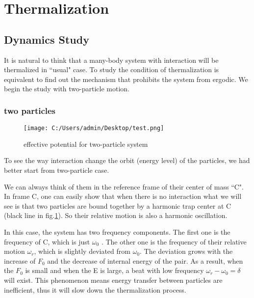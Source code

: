 \documentclass[aps,pre,twocolumn
,groupedaddress]{revtex4-1}
\begin{document}
\section{Thermalization}
\subsection{Dynamics Study}
It is natural to think that a many-body system with interaction will be thermalized in ``usual" case. To study the condition of thermalization is equivalent to find out the mechanism that prohibits the system from ergodic. We begin the study with two-particle motion. 
\subsubsection{two particles}

\begin{figure}[hbtp]
\centering
\texttt{[image: C:/Users/admin/Desktop/test.png]}
\caption{effective potential for two-particle system}
\label{fig:thermalization2}
\end{figure}

To see the way interaction change the orbit (energy level) of the particles, we had better start from two-particle case.

We can always think of them in the reference frame of their center of mass ``C". In frame C, one can easily show that when there is no interaction what we will see is that two particles are bound together by a harmonic trap center at C (black line in fig.\ref{fig:thermalization2}). So their relative motion is also a harmonic oscillation. 

In this case, the system has two frequency components. The first one is the frequency of C, which is just $\omega_0$ . The other one is the frequency of their relative motion $\omega_r$, which is slightly deviated from $\omega_0$. The deviation grows with the increase of $F_0$ and the decrease of internal energy of the pair. As a result, when the $F_0$ is small and when the E is large, a beat with low frequency $\omega_r-\omega_0=\delta$ will exist. This phenomenon means energy transfer between particles are inefficient, thus it will slow down the thermalization process. 
\end{document}
